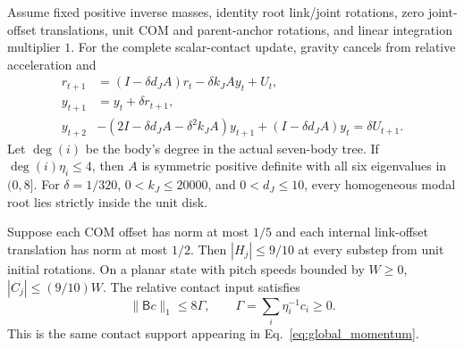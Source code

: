 \begin{proposition}
\label{prop:coupled_edges}
Assume fixed positive inverse masses, identity root link/joint rotations, zero joint-offset translations, unit COM and parent-anchor rotations, and linear integration multiplier $1$.
For the complete scalar-contact update, gravity cancels from relative acceleration and
\begin{align}
 r_{t+1}&=(I-\delta d_JA)r_t-\delta k_JAy_t+U_t,\nonumber\\
 y_{t+1}&=y_t+\delta r_{t+1},\nonumber\\
 y_{t+2}&-(2I-\delta d_JA-\delta^2k_JA)y_{t+1}
                 +(I-\delta d_JA)y_t=\delta U_{t+1}.
 \label{eq:coupled_edge_recurrence}
\end{align}
Let $\deg(i)$ be the body's degree in the actual seven-body tree.
If $\deg(i)\eta_i\le4$, then $A$ is symmetric positive definite with all six eigenvalues in $(0,8]$.
For $\delta=1/320$, $0<k_J\le20000$, and $0<d_J\le10$, every homogeneous modal root lies strictly inside the unit disk.

Suppose each COM offset has norm at most $1/5$ and each internal link-offset translation has norm at most $1/2$.
Then $|H_j|\le9/10$ at every substep from unit initial rotations.
On a planar state with pitch speeds bounded by $W\ge0$, $|C_j|\le(9/10)W$.
The relative contact input satisfies
\begin{equation}
 \|\mathsf Bc\|_1\le8\Gamma,\qquad
 \Gamma=\sum_i\eta_i^{-1}c_i\ge0.
 \label{eq:coupled_edge_contact}
\end{equation}
This is the same contact support appearing in Eq.~\eqref{eq:global_momentum}.
\end{proposition}

